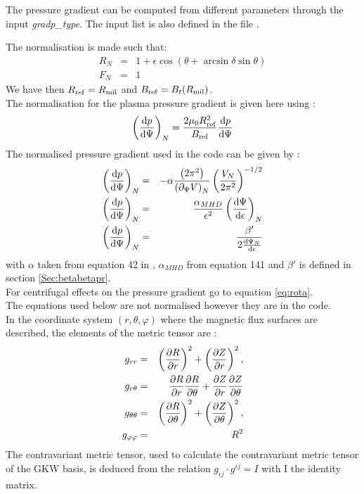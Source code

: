 The pressure gradient can be computed from different parameters through the input \textit{gradp\_type}.
The input list is also defined in the file .

The normalisation is made such that:
\begin{eqnarray}
R_N &=& 1 + \epsilon \cos (\theta + \arcsin \delta \sin \theta) \\
F_N &=& 1
\end{eqnarray}
We have then $R_{\rm ref} = R_{\rm mil}$ and $B_{\rm ref} = B_t(R_{\rm mil})$. \\
The normalisation for the plasma pressure gradient is given here using :
\begin{equation}
\left({\mathrm{d} p \over \mathrm{d} \Psi}\right)_N = {2 \mu_0 R_{\rm ref}^2\over B_{\rm ref}} {\mathrm{d} p \over \mathrm{d} \Psi}
\end{equation}
The normalised pressure gradient used in the code can be given by :
\begin{eqnarray}
\left({\mathrm{d} p \over \mathrm{d} \Psi}\right)_N &=& - \alpha {\left(2\pi^2\right) \over \left(\partial_{\Psi}V\right)_N } \left({V_N \over 2\pi ^2}\right)^{-1/2}\\
\left({\mathrm{d} p \over \mathrm{d} \Psi}\right)_N &=& {\alpha_{MHD}\over \epsilon ^2}\left({\mathrm{d} \Psi \over \mathrm{d} \epsilon}\right)_N \\
\left({\mathrm{d} p \over \mathrm{d} \Psi}\right)_N &=& {\beta ' \over 2 {\mathrm{d} \Psi_N \over \mathrm{d} \epsilon}}
\end{eqnarray}
with $\alpha$ taken from equation 42 in \cite{MIL98}, $\alpha_{MHD}$ from equation 141 \cite{CAN09} and $\beta '$ is defined in section \ref{Sec:betabetapr}. \\
For centrifugal effects on the pressure gradient go to equation \ref{eq:rota}. \\
The equations used below are not normalised however they are in the code. \\
In the coordinate system $(r,\theta,\varphi)$ where the magnetic flux surfaces are described, the elements of the metric tensor are :
\begin{eqnarray}
g_{rr} &=& \left(\frac{\partial  R}{\partial r}\right)^2 + \left(\frac{\partial  Z}{\partial r}\right)^2, \\
g_{r \theta} &=& \frac{\partial  R}{\partial r}\frac{\partial  R}{\partial \theta} + \frac{\partial  Z}{\partial r}\frac{\partial  Z}{\partial \theta} \\
g_{\theta \theta} &=& \left(\frac{\partial  R}{\partial \theta}\right)^2 + \left(\frac{\partial  Z}{\partial \theta}\right)^2, \\
g_{\varphi \varphi} &=& R^2
\end{eqnarray}
The contravariant metric tensor, used to calculate the contravariant metric tensor of the GKW basis, is deduced from the relation $g_{ij} \cdot g^{ij} = I$ with I the identity matrix.
